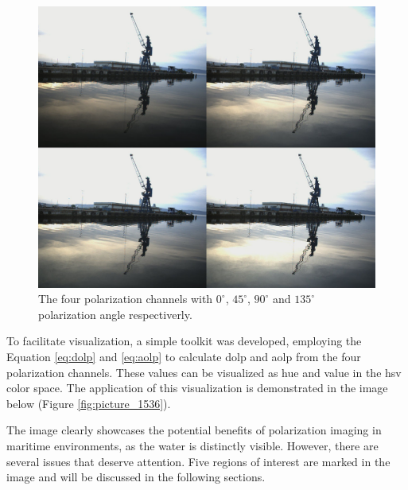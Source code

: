 \begin{figure}[H]
    \includegraphics[width=\textwidth]{figures/pictures/stacked_right_148.jpg}
    \caption{The four polarization channels with $0^\circ$, $45^\circ$, $90^\circ$ and $135^\circ$ polarization angle respectiverly.}
    \label{fig:stacked_pols}
\end{figure}


To facilitate visualization, a simple toolkit was developed, employing the Equation \ref{eq:dolp} and \ref{eq:aolp} to calculate \gls{dolp} and \gls{aolp} from the four polarization channels.
These values can be visualized as hue and value in the \gls{hsv} color space.
The application of this visualization is demonstrated in the image below (Figure \ref{fig:picture_1536}).

The image clearly showcases the potential benefits of polarization imaging in maritime environments, as the water is distinctly visible.
However, there are several issues that deserve attention.
Five regions of interest are marked in the image and will be discussed in the following sections.

